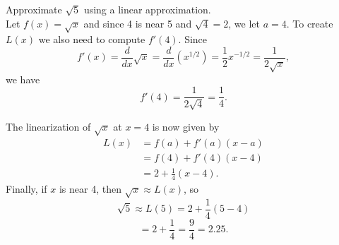 \documentclass[handout]{ximera}
\begin{document}
 

\begin{example}[example 1]
Approximate $\sqrt{5}$ using a linear approximation.\\ 
Let $f(x) = \sqrt x$ and since 4 is near 5 and $\sqrt{4} = 2$, we let 
$a = 4$. To create $L(x)$ we also need to compute $f'(4)$. 
Since 
\[f'(x) = \frac{d}{dx} \sqrt x = \frac{d}{dx}(x^{1/2})= \frac{1}{2}x^{-1/2}   = \frac{1}{2\sqrt x},\] 
we have
\[f'(4) = \frac{1}{2\sqrt{4}} = \frac{1}{4}.\]

The linearization of $\sqrt x$ at $x=4$ is now given by
\begin{align*}
L(x) &= f(a) + f'(a)(x - a) \\
&= f(4) + f'(4)(x - 4) \\
&= 2 + \frac{1}{4}(x - 4).
\end{align*}
Finally, if $x$ is near 4, then $\sqrt x \approx L(x)$, so
\[\sqrt{5} \approx L(5) = 2 + \frac{1}{4}(5-4)\]
\[ = 2+ \frac{1}{4} = \frac{9}{4} = 2.25.\]
\end{example}


\begin{image}
\end{image}

 
\end{document}
